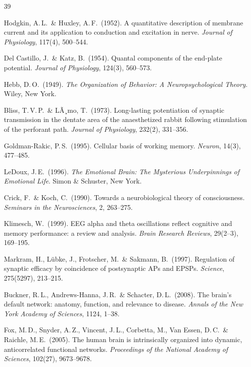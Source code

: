 ﻿\documentclass[12pt,a4paper]{report}
\theoremstyle{plain}
\theoremstyle{definition}
\theoremstyle{remark}
\begin{document}
	
	\begin{thebibliography}{39}
		
		Hodgkin, A.\,L.\ \& Huxley, A.\,F.\ (1952).
		A quantitative description of membrane current and its application to
		conduction and excitation in nerve.
		\textit{Journal of Physiology}, 117(4), 500--544.
		
		Del Castillo, J.\ \& Katz, B.\ (1954).
		Quantal components of the end-plate potential.
		\textit{Journal of Physiology}, 124(3), 560--573.
		
		Hebb, D.\,O.\ (1949).
		\textit{The Organization of Behavior: A Neuropsychological Theory}.
		Wiley, New York.
		
		Bliss, T.\,V.\,P.\ \& LÃ¸mo, T.\ (1973).
		Long-lasting potentiation of synaptic transmission in the dentate area
		of the anaesthetized rabbit following stimulation of the perforant path.
		\textit{Journal of Physiology}, 232(2), 331--356.
		
		Goldman-Rakic, P.\,S.\ (1995).
		Cellular basis of working memory.
		\textit{Neuron}, 14(3), 477--485.
		
		LeDoux, J.\,E.\ (1996).
		\textit{The Emotional Brain: The Mysterious Underpinnings of Emotional Life}.
		Simon \& Schuster, New York.
		
		Crick, F.\ \& Koch, C.\ (1990).
		Towards a neurobiological theory of consciousness.
		\textit{Seminars in the Neurosciences}, 2, 263--275.
		
		Klimesch, W.\ (1999).
		EEG alpha and theta oscillations reflect cognitive and memory performance:
		a review and analysis.
		\textit{Brain Research Reviews}, 29(2--3), 169--195.
		
		Markram, H., Lübke, J., Frotscher, M.\ \& Sakmann, B.\ (1997).
		Regulation of synaptic efficacy by coincidence of postsynaptic APs and EPSPs.
		\textit{Science}, 275(5297), 213--215.
		
		Buckner, R.\,L., Andrews-Hanna, J.\,R.\ \& Schacter, D.\,L.\ (2008).
		The brain's default network: anatomy, function, and relevance to disease.
		\textit{Annals of the New York Academy of Sciences}, 1124, 1--38.
		
		Fox, M.\,D., Snyder, A.\,Z., Vincent, J.\,L., Corbetta, M.,
		Van Essen, D.\,C.\ \& Raichle, M.\,E.\ (2005).
		The human brain is intrinsically organized into dynamic, anticorrelated
		functional networks.
		\textit{Proceedings of the National Academy of Sciences}, 102(27), 9673--9678.
		

\end{thebibliography}
\end{document}
